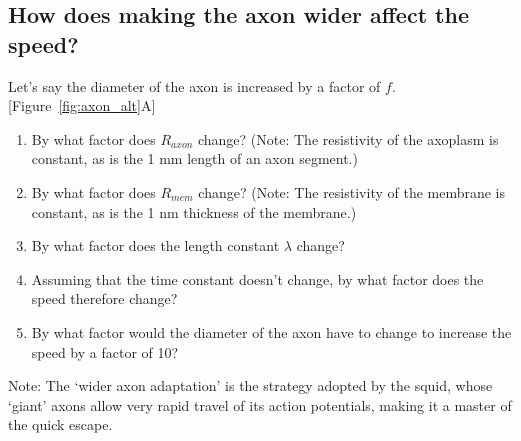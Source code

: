 \subsection*{How does making the axon wider affect the speed?}
Let's say the diameter of the axon is increased by a factor of $f$. [Figure~\ref{fig:axon_alt}A]
\begin{enumerate}
\itemsep-0.2em
\item By what factor does $R_{axon}$ change? (Note: The resistivity of the axoplasm is constant, as is the 1 mm length of an axon segment.)
\item By what factor does $R_{mem}$ change? (Note: The resistivity of the membrane is constant, as is the 1 nm thickness of the membrane.)
\item By what factor does the length constant $\lambda$ change?
\item Assuming that the time constant doesn't change, by what factor does the speed therefore change?
\item By what factor would the diameter of the axon have to change to increase the speed by a factor of 10?
\end{enumerate}
Note: The `wider axon adaptation' is the strategy adopted by the squid, whose `giant' axons allow very rapid travel of its action potentials, making it a master of the quick escape.

\newpage

